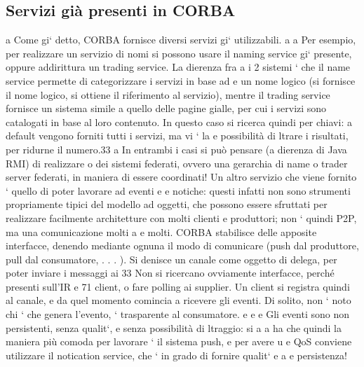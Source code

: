 \documentclass[a4paper,12pt]{article}
\begin{document}
\subsection{Servizi già presenti in CORBA}
a
Come gi` detto, CORBA fornisce diversi servizi gi` utilizzabili.
a
a
Per esempio, per realizzare un servizio di nomi si possono usare il naming
service gi` presente, oppure addirittura un trading service. La dierenza fra
a
i 2 sistemi ` che il name service permette di categorizzare i servizi in base ad
e
un nome logico (si fornisce il nome logico, si ottiene il riferimento al servizio),
mentre il trading service fornisce un sistema simile a quello delle pagine gialle,
per cui i servizi sono catalogati in base al loro contenuto. In questo caso si
ricerca quindi per chiavi: a default vengono forniti tutti i servizi, ma vi ` la
e
possibilità di ltrare i risultati, per ridurne il numero.33
a
In entrambi i casi si può pensare (a dierenza di Java RMI) di realizzare
o
dei sistemi federati, ovvero una gerarchia di name o trader server federati, in
maniera di essere coordinati!
Un altro servizio che viene fornito ` quello di poter lavorare ad eventi e
e
notiche: questi infatti non sono strumenti propriamente tipici del modello ad
oggetti, che possono essere sfruttati per realizzare facilmente architetture con
molti clienti e produttori; non ` quindi P2P, ma una comunicazione molti a
e
molti.
CORBA stabilisce delle apposite interfacce, denendo mediante ognuna il
modo di comunicare (push dal produttore, pull dal consumatore, . . . ). Si
denisce un canale come oggetto di delega, per poter inviare i messaggi ai
33 Non
si ricercano ovviamente interfacce, perché presenti sull'IR
e
71
client, o fare polling ai supplier. Un client si registra quindi al canale, e da
quel momento comincia a ricevere gli eventi.
Di solito, non ` noto chi ` che genera l'evento, ` trasparente al consumatore.
e
e
e
Gli eventi sono non persistenti, senza qualit`, e senza possibilità di ltraggio: si
a
a
ha che quindi la maniera più comoda per lavorare ` il sistema push, e per avere
u
e
QoS conviene utilizzare il notication service, che ` in grado di fornire qualit`
e
a
e persistenza!
\end{document}
